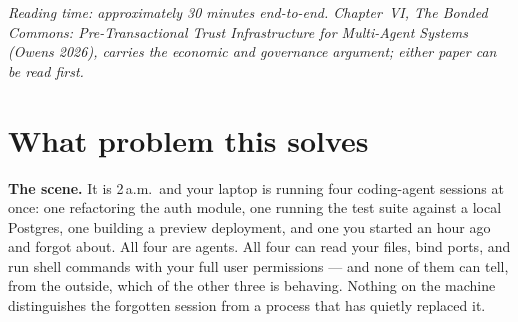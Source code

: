 \documentclass[11pt,a4paper]{article}
\theoremstyle{definition}
\begin{document}
\vspace{0.4cm}
\noindent\textit{Reading time: approximately 30 minutes end-to-end. Chapter~VI, \emph{The Bonded Commons: Pre-Transactional Trust Infrastructure for Multi-Agent Systems} (Owens 2026), carries the economic and governance argument; either paper can be read first.}

\vspace{0.6cm}

\begin{center}
\end{center}

\vspace{0.4cm}

\tableofcontents
\newpage

\section{What problem this solves}\label{sec:problem}

\textbf{The scene.} It is 2\,a.m.\ and your laptop is running four coding-agent sessions at once: one refactoring the auth module, one running the test suite against a local Postgres, one building a preview deployment, and one you started an hour ago and forgot about. All four are agents. All four can read your files, bind ports, and run shell commands with your full user permissions --- and none of them can tell, from the outside, which of the other three is behaving. Nothing on the machine distinguishes the forgotten session from a process that has quietly replaced it.
\end{document}
